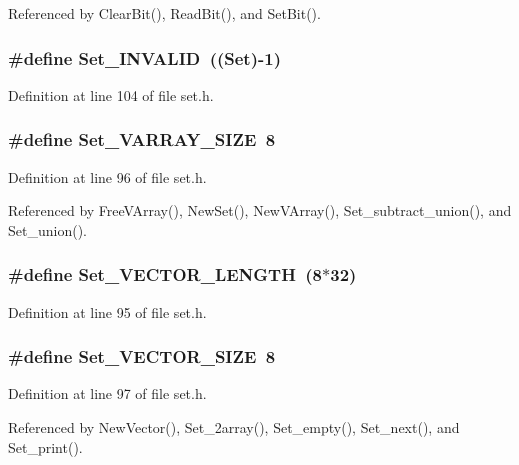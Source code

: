 Referenced by Clear\-Bit(), Read\-Bit(), and Set\-Bit().
\subsubsection{\setlength{\rightskip}{0pt plus 5cm}\#define Set\_\-INVALID~((\bf{Set})-1)}\label{set_8h_0d31d65b1504e93066f9cfbb608dc488}




Definition at line 104 of file set.h.
\subsubsection{\setlength{\rightskip}{0pt plus 5cm}\#define Set\_\-VARRAY\_\-SIZE~8}\label{set_8h_5e81e53e86a01b4503c97301188a1c04}




Definition at line 96 of file set.h.

Referenced by Free\-VArray(), New\-Set(), New\-VArray(), Set\_\-subtract\_\-union(), and Set\_\-union().
\subsubsection{\setlength{\rightskip}{0pt plus 5cm}\#define Set\_\-VECTOR\_\-LENGTH~(8$\ast$32)}\label{set_8h_e265d8d636e8513e2e80b9732cdf18a4}




Definition at line 95 of file set.h.
\subsubsection{\setlength{\rightskip}{0pt plus 5cm}\#define Set\_\-VECTOR\_\-SIZE~8}\label{set_8h_5e9cd7e2a4cd34c713d16ad7301bdb9b}




Definition at line 97 of file set.h.

Referenced by New\-Vector(), Set\_\-2array(), Set\_\-empty(), Set\_\-next(), and Set\_\-print().
